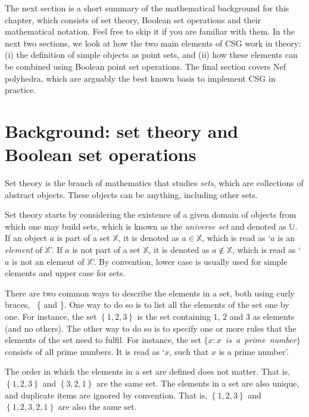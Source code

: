 The next section is a short summary of the mathematical background for this chapter, which consists of set theory, Boolean set operations and their mathematical notation.
Feel free to skip it if you are familiar with them.
In the next two sections, we look at how the two main elements of CSG work in theory: (i) the definition of simple objects as point sets, and (ii) how these elements can be combined using Boolean point set operations.
The final section covers Nef polyhedra, which are arguably the best known basis to implement CSG in practice.

\section{Background: set theory and Boolean set operations}

Set theory is the branch of mathematics that studies \emph{sets}, which are collections of abstract objects.
These objects can be anything, including other sets.

Set theory starts by considering the existence of a given domain of objects from which one may build sets, which is known as the \emph{universe set} and denoted as \(\mathbb{U}\).
If an object \(a\) is part of a set \(\mathbb{X}\), it is denoted as \(a \in \mathbb{X}\), which is read as `\(a\) is an \emph{element} of \(\mathbb{X}\)'.
If \(a\) is not part of a set \(\mathbb{X}\), it is denoted as \(a \notin \mathbb{X}\), which is read as `\(a\) is not an element of \(\mathbb{X}\)'.
By convention, lower case is usually used for simple elements and upper case for sets.

There are two common ways to describe the elements in a set, both using curly braces, \ie\ \{ and \}.
One way to do so is to list all the elements of the set one by one.
For instance, the set \(\left\{ 1,2,3 \right\}\) is the set containing \(1\), \(2\) and \(3\) as elements (and no others).
The other way to do so is to specify one or more rules that the elements of the set need to fulfil.
For instance, the set \(\{ x : x\)~\emph{is~a~prime~number}\(\}\) consists of all prime numbers.
It is read as `\(x\), such that \(x\) is a prime number'.

The order in which the elements in a set are defined does not matter.
That is, \(\left\{ 1,2,3 \right\}\) and \(\left\{ 3,2,1 \right\}\) are the same set.
The elements in a set are also unique, and duplicate items are ignored by convention.
That is, \(\left\{ 1,2,3 \right\}\) and \(\left\{ 1,2,3,2,1 \right\}\) are also the same set.

